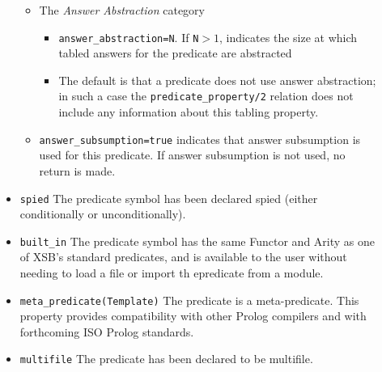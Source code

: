 \begin{description}
\begin{itemize}
\begin{itemize}
\begin{itemize}
\end{itemize}
\item The {\em Answer Abstraction} category
\begin{itemize}
\item{\tt answer\_abstraction=N}.  If {\tt N}$>1$, indicates the size at
  which tabled answers for the predicate are abstracted
%
\item The default is that a predicate does not use answer
  abstraction; in such a case the {\tt predicate\_property/2} relation
  does not include any information about this tabling property.
\end{itemize}
\item {\tt answer\_subsumption=true} indicates that answer subsumption
  is used for this predicate.  If answer subsumption is not used, no
  return is made.
\end{itemize}
%
\item{\tt spied} The predicate symbol has been declared spied (either
  conditionally or unconditionally).
%
%
\item{\tt built\_in} The predicate symbol has the same
  Functor and Arity as one of XSB's standard predicates, and is
  available to the user without needing to load a file or import
 th epredicate from a module. 
%
%
\item{\tt meta\_predicate(Template)}  The
  predicate is a meta-predicate. This property provides
  compatibility with other Prolog compilers and with forthcoming
  ISO Prolog standards. 
%
\item{\tt multifile} The predicate has been declared to be multifile.
\end{itemize}


\end{description}
